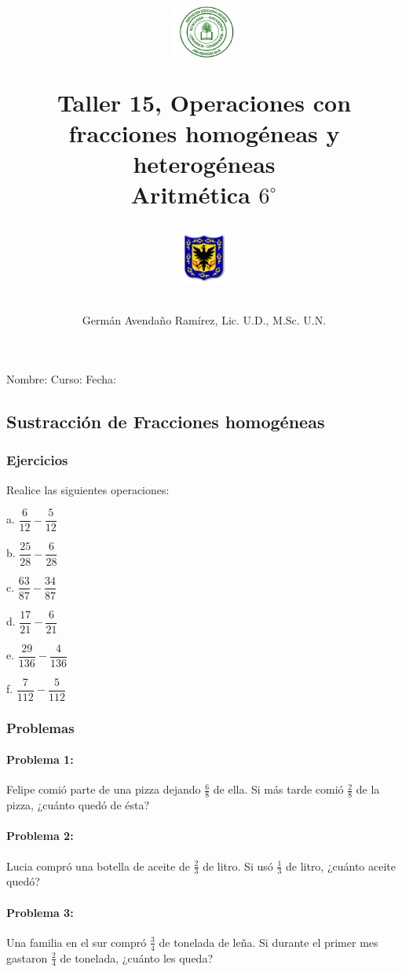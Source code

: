 \documentclass[10pt,twoside]{article}
\author{Germ\'an Avenda\~no Ram\'irez, Lic. U.D., M.Sc. U.N.}
\title{\begin{minipage}{.2\textwidth}
\includegraphics[height=1.75cm]{Images/logo-colegio.png}\end{minipage}
\begin{minipage}{.55\textwidth}
\begin{center}
Taller 15, Operaciones con fracciones homogéneas y heterogéneas \\
Aritmética $6^{\circ}$
\end{center}
\end{minipage}\hfill
\begin{minipage}{.2\textwidth}
\includegraphics[height=1.75cm]{Images/logo-sed.png} 
\end{minipage}}
\date{}
\begin{document}
\maketitle
Nombre: \hrulefill Curso: \underline{\hspace*{44pt}} Fecha: \underline{\hspace*{2.5cm}}
\subsection*{Sustracción de Fracciones homog\'{e}neas}
\subsubsection*{Ejercicios}
Realice las siguientes operaciones:
\begin{enumerate}
\begin{multicols}{3}
\item[a.] $\dfrac{6}{12}-\dfrac{5}{12}$
\item[b.] $\dfrac{25}{28}-\dfrac{6}{28}$
\item[c.] $\dfrac{63}{87}-\dfrac{34}{87}$
\item[d.] $\dfrac{17}{21}-\dfrac{6}{21}$
\item[e.] $\dfrac{29}{136}-\dfrac{4}{136}$
\item[f.] $\dfrac{7}{112}-\dfrac{5}{112}$
\end{multicols}
\end{enumerate}
\subsubsection*{Problemas}
\paragraph*{Problema 1:} Felipe comi\'{o} parte de una pizza dejando $\frac{6}{8}$ de ella. Si m\'{a}s tarde comi\'{o} $\frac{2}{8}$ de la pizza, ¿cu\'{a}nto qued\'{o} de \'{e}sta?
\paragraph*{Problema 2:}
Lucia compró una botella de aceite de $\frac{2}{3}$ de litro. Si usó $\frac{1}{3}$ de litro, ¿cuánto aceite quedó?
\paragraph*{Problema 3:} Una familia en el sur compr\'{o} $\frac{3}{4}$ de tonelada de leña. Si durante el primer mes gastaron $\frac{2}{4}$ de tonelada, ¿cuánto les queda?
\end{document}
